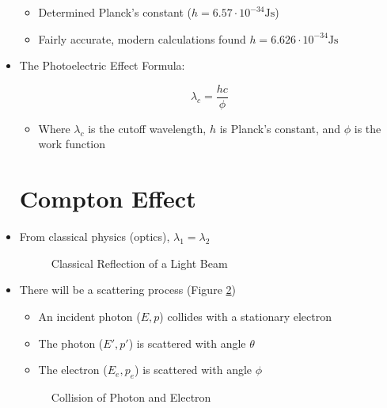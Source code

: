 \begin{itemize}
    \begin{itemize}

      \item Determined Planck's constant ($h=6.57\cdot10^{-34}\si{\joule\second}$)

      \item Fairly accurate, modern calculations found $h=6.626\cdot10^{-34} \si{\joule\second}$

    \end{itemize}

  \item The Photoelectric Effect Formula:

    $$\boxed{\lambda_c=\frac{hc}{\phi}}$$

    \begin{itemize}

      \item Where $\lambda_c$ is the cutoff wavelength, $h$ is Planck's constant, and $\phi$ is the work function

    \end{itemize}

    \section{Compton Effect}

  \item From classical physics (optics), $\lambda_1=\lambda_2$

    \begin{figure}[h!]
      \centering
      
      \caption{Classical Reflection of a Light Beam}
      \label{fig:2}
    \end{figure}

  \item There will be a scattering process (Figure \ref{fig:3})

    \begin{itemize}

      \item An incident photon ($E,p$) collides with a stationary electron

      \item The photon ($E',p'$) is scattered with angle $\theta$

      \item The electron ($E_e,p_e$) is scattered with angle $\phi$

    \end{itemize}

    \begin{figure}[h!]
      \centering
      
      \caption{Collision of Photon and Electron}
      \label{fig:3}
    \end{figure}


\end{itemize}
